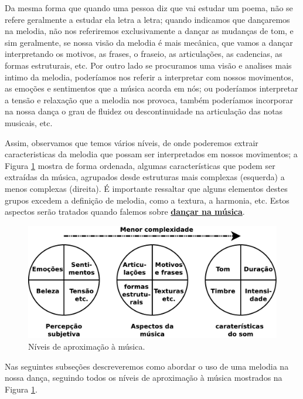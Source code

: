 Da mesma forma que quando uma pessoa diz que vai estudar um poema, 
não se refere geralmente a estudar ela letra a letra;
quando indicamos que dançaremos na melodia,
não nos referiremos exclusivamente a dançar as mudanças de tom, 
e sim geralmente, se nossa visão da melodia é mais mecânica, que vamos a dançar interpretando os motivos, as frases,
o fraseio, as articulações, as cadencias, as formas estruturais, etc.
Por outro lado se procuramos uma visão e analises mais intimo da melodia,
poderíamos nos referir a interpretar com nossos movimentos, as emoções e sentimentos que a música acorda em nós;
ou poderíamos interpretar a tensão e relaxação que a melodia nos provoca,
também poderíamos incorporar na nossa dança o grau de fluidez ou descontinuidade na articulação das notas musicais, etc.

Assim, observamos que temos vários níveis, 
de onde poderemos extrair caracteristicas da melodia que possam ser interpretados em nossos movimentos;
a Figura \ref{fig:etapa-melodica-1} mostra de forma ordenada,
algumas características que podem ser extraídas da música, 
agrupados desde estruturas mais complexas (esquerda) a menos complexas (direita).
É importante ressaltar que alguns elementos destes grupos excedem a definição de melodia, como a textura, a harmonia, etc.
Estos aspectos serão tratados quando falemos sobre \hyperref[subsec:dancamusica]{\textbf{dançar na música}}.

\begin{figure}[!h]
    \centering
    \includegraphics[width=\textwidth]{chapters/cap-musicalidade-tecnica/etapa-melodica-1.eps}
    \caption{Níveis de aproximação à música.}
    \label{fig:etapa-melodica-1}
\end{figure}

Nas seguintes subseções descreveremos como abordar o uso de uma melodia na nossa dança,
seguindo todos os níveis de aproximação à música mostrados na Figura \ref{fig:etapa-melodica-1}.


